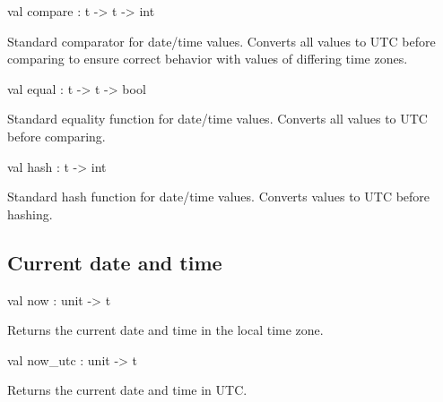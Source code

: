 \documentclass[11pt]{article}
\begin{document}
\label{val:XmlRpcDateTime.compare}\begin{ocamldoccode}
val compare : t -> t -> int
\end{ocamldoccode}
\begin{ocamldocdescription}
Standard comparator for date/time values. Converts all values to UTC
    before comparing to ensure correct behavior with values of differing
    time zones.


\end{ocamldocdescription}




\label{val:XmlRpcDateTime.equal}\begin{ocamldoccode}
val equal : t -> t -> bool
\end{ocamldoccode}
\begin{ocamldocdescription}
Standard equality function for date/time values. Converts all values
    to UTC before comparing.


\end{ocamldocdescription}




\label{val:XmlRpcDateTime.hash}\begin{ocamldoccode}
val hash : t -> int
\end{ocamldoccode}
\begin{ocamldocdescription}
Standard hash function for date/time values. Converts values to UTC
    before hashing.


\end{ocamldocdescription}




\subsection{Current date and time}




\label{val:XmlRpcDateTime.now}\begin{ocamldoccode}
val now : unit -> t
\end{ocamldoccode}
\begin{ocamldocdescription}
Returns the current date and time in the local time zone.


\end{ocamldocdescription}




\label{val:XmlRpcDateTime.now-underscoreutc}\begin{ocamldoccode}
val now_utc : unit -> t
\end{ocamldoccode}
\begin{ocamldocdescription}
Returns the current date and time in UTC.


\end{ocamldocdescription}
\end{document}
